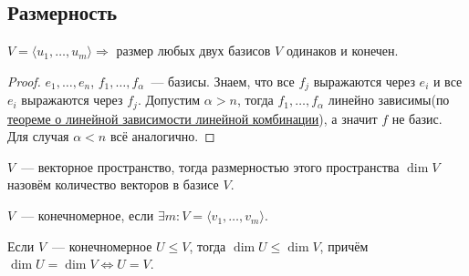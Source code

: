 \subsection{Размерность}
\begin{theorem}
    $V = \langle u_1,\dots,u_m\rangle \Rightarrow$ размер любых двух базисов $V$ одинаков и конечен.
\end{theorem}
\begin{proof}
    $e_1,\dots,e_n$, $f_1,\dots,f_\alpha$~--- базисы. Знаем, что все $f_j$
    выражаются через $e_i$ и все $e_i$ выражаются через $f_j$.
    Допустим $\alpha > n$, тогда $f_1,\dots,f_\alpha$ линейно зависимы(по \hyperref[thm:О линейной зависимости линейной комбинации]
    {теореме о линейной зависимости линейной комбинации}), а значит $f$ не базис.
    Для случая $\alpha < n$ всё аналогично.
\end{proof}
\begin{definition}
    $V$~--- векторное пространство, тогда размерностью этого пространства $\dim V$ назовём
     количество векторов в базисе $V$.
\end{definition}
\begin{definition}
    $V$~--- конечномерное, если $\exists m\colon V = \langle v_1,\dots, v_m\rangle$.
\end{definition}
\begin{theorem}
    Если $V$~--- конечномерное $U \leq V$, тогда $\dim U \leq \dim V$, причём $\dim U = \dim V \Leftrightarrow U=V$.
\end{theorem}

